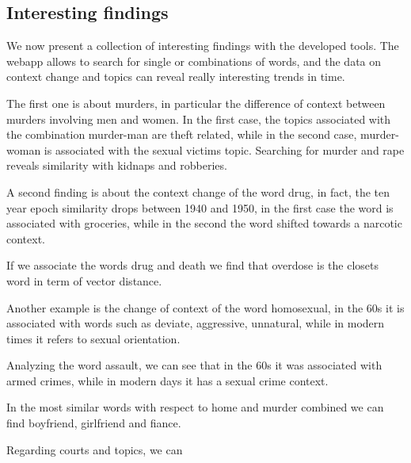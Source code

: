 \subsection{Interesting findings}
\label{sec:Interesting findings}

We now present a collection of interesting findings with the developed tools.
The webapp allows to search for single or combinations of words, and the data on context change and topics can 
reveal really interesting trends in time. 

The first one is about murders, in particular the difference of context between murders involving men and 
women. In the first case, the topics associated with the combination murder-man are theft related, while in the 
second case, murder-woman is associated with the sexual victims topic. Searching for murder and rape reveals 
similarity with kidnaps and robberies. 

A second finding is about the context change of the word drug, in fact, the ten year epoch similarity 
drops between 1940 and 1950, in the first case the word is associated with groceries, while in the 
second the word shifted towards a narcotic context.

If we associate the words drug and death we find that overdose is the closets word in term of vector distance.

Another example is the change of context of the word homosexual, in the 60s it is associated with words such as 
deviate, aggressive, unnatural, while in modern times it refers to sexual orientation.

Analyzing the word assault, we can see that in the 60s it was associated with armed crimes, 
while in modern days it has a sexual crime context. 

In the most similar words with respect to home and murder combined we can find boyfriend, girlfriend and fiance.

Regarding courts and topics, we can 